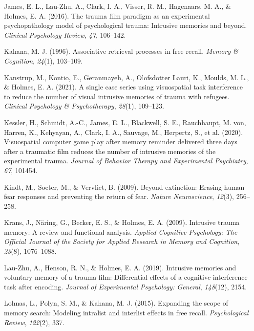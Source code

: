 \documentclass[
  man,
  floatsintext,
  longtable,
  nolmodern,
  notxfonts,
  notimes,
  draftfirst,
  colorlinks=true,linkcolor=blue,citecolor=blue,urlcolor=blue]{apa7}
\newlength{\cslhangindent}
\newenvironment{CSLReferences}[2] %
 {\begin{list}{}{%
  \setlength{\itemindent}{0pt}
  \setlength{\leftmargin}{0pt}
  \setlength{\parsep}{0pt}
  \ifodd #1
   \setlength{\leftmargin}{\cslhangindent}
   \setlength{\itemindent}{-1\cslhangindent}
  \fi
  \setlength{\itemsep}{#2\baselineskip}}}
 {\end{list}}
\begin{document}
\begin{CSLReferences}{1}{0}
James, E. L., Lau-Zhu, A., Clark, I. A., Visser, R. M., Hagenaars, M.
A., \& Holmes, E. A. (2016). The trauma film paradigm as an experimental
psychopathology model of psychological trauma: Intrusive memories and
beyond. \emph{Clinical Psychology Review}, \emph{47}, 106--142.

Kahana, M. J. (1996). Associative retrieval processes in free recall.
\emph{Memory \& Cognition}, \emph{24}(1), 103--109.

Kanstrup, M., Kontio, E., Geranmayeh, A., Olofsdotter Lauri, K., Moulds,
M. L., \& Holmes, E. A. (2021). A single case series using visuospatial
task interference to reduce the number of visual intrusive memories of
trauma with refugees. \emph{Clinical Psychology \& Psychotherapy},
\emph{28}(1), 109--123.

Kessler, H., Schmidt, A.-C., James, E. L., Blackwell, S. E., Rauchhaupt,
M. von, Harren, K., Kehyayan, A., Clark, I. A., Sauvage, M., Herpertz,
S., et al. (2020). Visuospatial computer game play after memory reminder
delivered three days after a traumatic film reduces the number of
intrusive memories of the experimental trauma. \emph{Journal of Behavior
Therapy and Experimental Psychiatry}, \emph{67}, 101454.

Kindt, M., Soeter, M., \& Vervliet, B. (2009). Beyond extinction:
Erasing human fear responses and preventing the return of fear.
\emph{Nature Neuroscience}, \emph{12}(3), 256--258.

Krans, J., Näring, G., Becker, E. S., \& Holmes, E. A. (2009). Intrusive
trauma memory: A review and functional analysis. \emph{Applied Cognitive
Psychology: The Official Journal of the Society for Applied Research in
Memory and Cognition}, \emph{23}(8), 1076--1088.

Lau-Zhu, A., Henson, R. N., \& Holmes, E. A. (2019). Intrusive memories
and voluntary memory of a trauma film: Differential effects of a
cognitive interference task after encoding. \emph{Journal of
Experimental Psychology: General}, \emph{148}(12), 2154.

Lohnas, L., Polyn, S. M., \& Kahana, M. J. (2015). Expanding the scope
of memory search: Modeling intralist and interlist effects in free
recall. \emph{Psychological Review}, \emph{122}(2), 337.


\end{CSLReferences}
\end{document}
